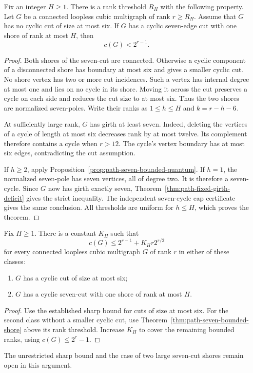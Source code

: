 \begin{theorem}
\label{thm:path-seven-bounded-shore}
Fix an integer $H\ge1$.
There is a rank threshold $R_H$ with the following property.
Let $G$ be a connected loopless cubic multigraph of rank $r\ge R_H$.
Assume that $G$ has no cyclic cut of size at most six.
If $G$ has a cyclic seven-edge cut with one shore of rank at most $H$, then
\[
 c(G)<2^{r-1}.
\]
\end{theorem}

\begin{proof}
Both shores of the seven-cut are connected.
Otherwise a cyclic component of a disconnected shore has boundary at most six and gives a smaller cyclic cut.
No shore vertex has two or more cut incidences.
Such a vertex has internal degree at most one and lies on no cycle in its shore.
Moving it across the cut preserves a cycle on each side and reduces the cut size to at most six.
Thus the two shores are normalized seven-poles.
Write their ranks as $1\le h\le H$ and $k=r-h-6$.

At sufficiently large rank, $G$ has girth at least seven.
Indeed, deleting the vertices of a cycle of length at most six decreases rank by at most twelve.
Its complement therefore contains a cycle when $r>12$.
The cycle's vertex boundary has at most six edges, contradicting the cut assumption.

If $h\ge2$, apply Proposition~\ref{prop:path-seven-bounded-quantum}.
If $h=1$, the normalized seven-pole has seven vertices, all of degree two.
It is therefore a seven-cycle.
Since $G$ now has girth exactly seven, Theorem~\ref{thm:path-fixed-girth-deficit} gives the strict inequality.
The independent seven-cycle cap certificate gives the same conclusion.
All thresholds are uniform for $h\le H$, which proves the theorem.
\end{proof}

\begin{corollary}
\label{cor:path-seven-bounded-sharp}
Fix $H\ge1$.
There is a constant $K_H$ such that
\[
 c(G)\le2^{r-1}+K_H r2^{r/2}
\]
for every connected loopless cubic multigraph $G$ of rank $r$ in either of these classes:
\begin{enumerate}
\item $G$ has a cyclic cut of size at most six;
\item $G$ has a cyclic seven-cut with one shore of rank at most $H$.
\end{enumerate}
\end{corollary}

\begin{proof}
Use the established sharp bound for cuts of size at most six.
For the second class without a smaller cyclic cut, use Theorem~\ref{thm:path-seven-bounded-shore} above its rank threshold.
Increase $K_H$ to cover the remaining bounded ranks, using $c(G)\le2^r-1$.
\end{proof}

The unrestricted sharp bound and the case of two large seven-cut shores remain open in this argument.
